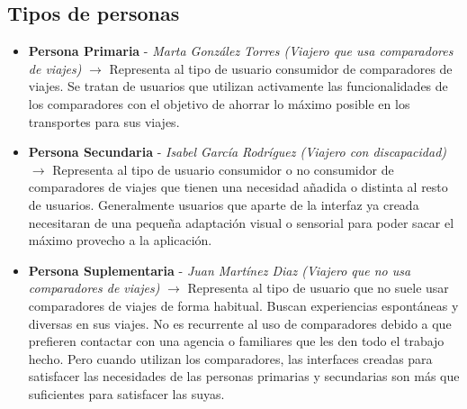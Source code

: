 \subsection{Tipos de personas}
\begin{itemize}
    \item \textbf{Persona Primaria} - \textit{Marta González Torres (Viajero que usa comparadores de viajes)} $\rightarrow$ Representa al tipo de usuario consumidor de comparadores de viajes. Se tratan de usuarios que utilizan activamente las funcionalidades de los comparadores con el objetivo de ahorrar lo máximo posible en los transportes para sus viajes.
    \item \textbf{Persona Secundaria} - \textit{Isabel García Rodríguez (Viajero con discapacidad)} $\rightarrow$ Representa al tipo de usuario consumidor o no consumidor de comparadores de viajes que tienen una necesidad añadida o distinta al resto de usuarios. 
    Generalmente usuarios que aparte de la interfaz ya creada necesitaran de una pequeña adaptación visual o sensorial para poder sacar el máximo provecho a la aplicación.
    \item \textbf{Persona Suplementaria} - \textit{Juan Martínez Diaz (Viajero que no usa comparadores de viajes)} $\rightarrow$ Representa al tipo de usuario que no suele usar comparadores de viajes de forma habitual. Buscan experiencias espontáneas y diversas en sus viajes. No es recurrente al uso de comparadores debido a que prefieren contactar con una agencia o familiares que les den todo el trabajo hecho. Pero cuando utilizan los comparadores, las interfaces creadas para satisfacer las necesidades de las personas primarias y secundarias son más que suficientes para satisfacer las suyas.
\end{itemize}